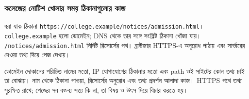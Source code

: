 \subsubsection{কলেজের নোটিশ খোলার সময় ঠিকানাগুলোর কাজ}
ধরা যাক ঠিকানা \texttt{https://college.example/notices/admission.html}। \texttt{college.example} হলো ডোমেইন; DNS থেকে তার সঙ্গে সংশ্লিষ্ট ঠিকানা খোঁজা যায়। \texttt{/notices/admission.html} নির্দিষ্ট রিসোর্সের পথ। ব্রাউজার HTTPS-এ অনুরোধ পাঠায় এবং সার্ভারের দেওয়া তথ্য দিয়ে পেজ দেখায়।

ডোমেইন দোকানের পরিচিত নামের মতো, IP যোগাযোগের ঠিকানার মতো এবং path ওই সাইটের কোন তথ্য চাই তা বোঝায়। নাম থেকে ঠিকানা পাওয়া, রিসোর্সের অনুরোধ এবং তথ্য প্রদর্শন আলাদা কাজ। HTTPS পথে তথ্য সুরক্ষিত রাখে; পেজের সব বক্তব্য সত্য কি না, তা বিষয় ও উৎস দিয়ে বিচার করতে হয়।
